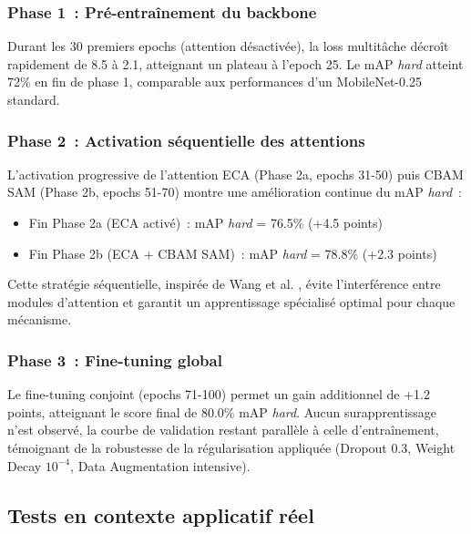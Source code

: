 \begin{onehalfspace}
\subsubsection{Phase 1~: Pré-entraînement du backbone}

\hspace{0.65 cm}Durant les 30 premiers epochs (attention désactivée), la loss multitâche décroît rapidement de 8.5 à 2.1, atteignant un plateau à l'epoch 25. Le mAP \textit{hard} atteint 72\% en fin de phase 1, comparable aux performances d'un MobileNet-0.25 standard.

\subsubsection{Phase 2~: Activation séquentielle des attentions}

\hspace{0.65 cm}L'activation progressive de l'attention ECA (Phase 2a, epochs 31-50) puis CBAM SAM (Phase 2b, epochs 51-70) montre une amélioration continue du mAP \textit{hard}~:
\begin{itemize}
\item Fin Phase 2a (ECA activé)~: mAP \textit{hard} = 76.5\% (+4.5 points)
\item Fin Phase 2b (ECA + CBAM SAM)~: mAP \textit{hard} = 78.8\% (+2.3 points)
\end{itemize}

\hspace{0.65 cm}Cette stratégie séquentielle, inspirée de Wang et al. \cite{Wang2024ECACBAM}, évite l'interférence entre modules d'attention et garantit un apprentissage spécialisé optimal pour chaque mécanisme.

\subsubsection{Phase 3~: Fine-tuning global}

\hspace{0.65 cm}Le fine-tuning conjoint (epochs 71-100) permet un gain additionnel de +1.2 points, atteignant le score final de 80.0\% mAP \textit{hard}. Aucun surapprentissage n'est observé, la courbe de validation restant parallèle à celle d'entraînement, témoignant de la robustesse de la régularisation appliquée (Dropout 0.3, Weight Decay $10^{-4}$, Data Augmentation intensive).

\subsection{Tests en contexte applicatif réel}


\end{onehalfspace}
